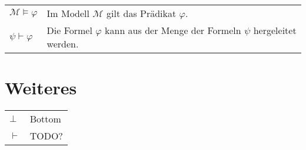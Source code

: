 \settowidth{}
\setlength\mylengthb{\dimexpr\columnwidth-\mylengtha-2\tabcolsep\relax}

\begin{xtabular}{@{} p{\mylengtha} P{\mylengthb} @{}}
$\mathcal{M} \models \varphi$& Im Modell $\mathcal{M}$ gilt das Prädikat $\varphi$.\\
$\psi \vdash \varphi$        & Die Formel $\varphi$ kann aus der Menge der Formeln $\psi$ hergeleitet werden.\\
\end{xtabular}
\section*{Weiteres}

\settowidth\mylengtha{$\bot$}
\setlength\mylengthb{\dimexpr\columnwidth-\mylengtha-2\tabcolsep\relax}

\begin{xtabular}{@{} p{\mylengtha} P{\mylengthb} @{}}
$\bot$  & Bottom\\
$\vdash$& TODO?
\end{xtabular}